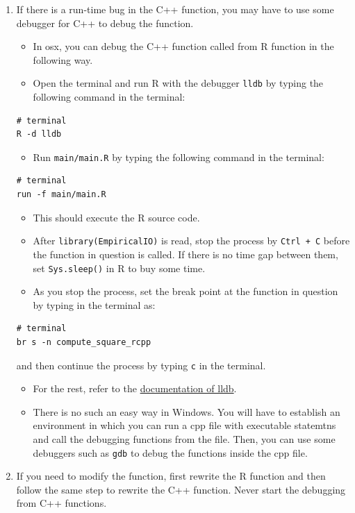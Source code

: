 \documentclass[
]{book}
\providecommand{\tightlist}{%
  \setlength{\itemsep}{0pt}\setlength{\parskip}{0pt}}
\begin{document}
\begin{enumerate}
\def\labelenumi{\arabic{enumi}.}
\setcounter{enumi}{11}
\tightlist
\item
  If there is a run-time bug in the C++ function, you may have to use some debugger for C++ to debug the function.

  \begin{itemize}
  \tightlist
  \item
    In osx, you can debug the C++ function called from R function in the following way.
  \item
    Open the terminal and run R with the debugger \texttt{lldb} by typing the following command in the terminal:
  \end{itemize}

\begin{verbatim}
# terminal
R -d lldb
\end{verbatim}

  \begin{itemize}
  \tightlist
  \item
    Run \texttt{main/main.R} by typing the following command in the terminal:
  \end{itemize}

\begin{verbatim}
# terminal
run -f main/main.R
\end{verbatim}

  \begin{itemize}
  \tightlist
  \item
    This should execute the R source code.
  \item
    After \texttt{library(EmpiricalIO)} is read, stop the process by \texttt{Ctrl\ +\ C} before the function in question is called. If there is no time gap between them, set \texttt{Sys.sleep()} in R to buy some time.
  \item
    As you stop the process, set the break point at the function in question by typing in the terminal as:
  \end{itemize}

\begin{verbatim}
# terminal
br s -n compute_square_rcpp
\end{verbatim}

  and then continue the process by typing \texttt{c} in the terminal.

  \begin{itemize}
  \tightlist
  \item
    For the rest, refer to the \href{https://lldb.llvm.org/}{documentation of lldb}.
  \item
    There is no such an easy way in Windows. You will have to establish an environment in which you can run a cpp file with executable statemtns and call the debugging functions from the file. Then, you can use some debuggers such as \texttt{gdb} to debug the functions inside the cpp file.
  \end{itemize}
\item
  If you need to modify the function, first rewrite the R function and then follow the same step to rewrite the C++ function. Never start the debugging from C++ functions.
\end{enumerate}
\end{document}
